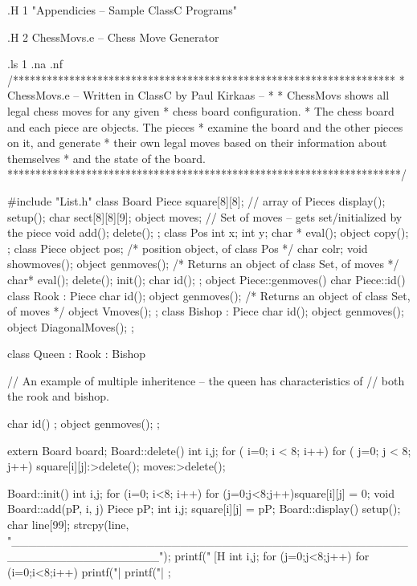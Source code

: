 .H 1 "Appendicies -- Sample ClassC Programs"

.H 2 ChessMovs.e  -- Chess Move Generator

.ls 1
.na
.nf
/********************************************************************
 *        ChessMovs.e -- Written in ClassC by Paul Kirkaas --
 *
 *        ChessMovs shows all legal chess moves for any given
 *        chess board configuration.
 *        The chess board and each piece are objects.  The pieces
 *        examine the board and the other pieces on it, and generate
 *        their own legal moves based on their information about themselves
 *        and the state of the board.
 **********************************************************************/

#include "List.h"
class Board
{  Piece square[8][8];  // array of Pieces
   display();
   setup();
   char  sect[8][8][9];
   object moves; // Set of moves -- gets set/initialized by the piece
   void add();
   delete();
};
class Pos { int x;
            int y;
            char * eval();
            object copy();
           };
class Piece
{
  object pos; /* position object, of class Pos */
  char colr;
  void showmoves();
  object genmoves(); /* Returns an object of class Set, of moves */
  char* eval();
  delete();
  init();
  char id();
 };
object Piece::genmoves() {}
char Piece::id() {}
class Rook : Piece
{
 char id();
 object genmoves(); /* Returns an object of class Set, of moves */
 object Vmoves();
 };
class Bishop : Piece
{char id();
 object genmoves();
 object DiagonalMoves();
 };


class Queen : Rook : Bishop

// An example of multiple inheritence -- the queen has characteristics of
// both the rook and bishop.

{char id() ;
 object genmoves();
 };

extern Board board;
Board::delete()
{ int i,j;
  for ( i=0; i < 8; i++) for ( j=0; j < 8; j++) square[i][j]:>delete();
  moves:>delete();
}


Board::init()
  {
   int i,j;
   for (i=0; i<8; i++) for (j=0;j<8;j++)square[i][j] = 0;
  }
void Board::add(pP, i, j) Piece pP; int i,j;
{square[i][j] = pP;}
Board::display()
{ setup();
  char line[99];
  strcpy(line,
        "_________________________________________________________________\n");
  printf("[H%
  int i,j;
  for (j=0;j<8;j++)
     {
     for (i=0;i<8;i++) printf("|%
     printf("|\n%
     }
};


